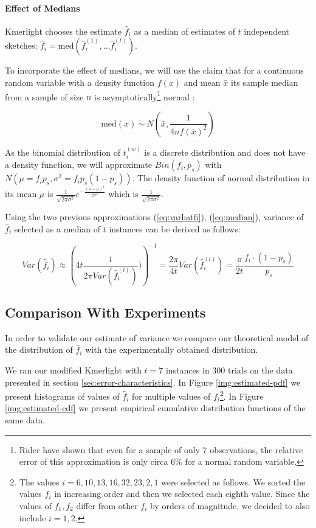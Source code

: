 \paragraph{Effect of Medians}
Kmerlight chooses the estimate $\hat f_i$ as a median of estimates of $t$ 
independent sketches: $\hat f_i = \mathrm{med}(\hat f_i^{(1)}, \dots \hat f_i^{(t)})$.

To incorporate the effect of medians, we will use the claim that for a continuous random
variable with a density function $f(x)$ and mean $\bar x$ its sample median from a sample of
size $n$ is asymptotically\footnote{Rider \cite{Rider1960} have shown that 
even for a sample of only $7$ observations, the relative error of this approximation is only
circa 6\% for a normal random variable.} normal \cite{WikiMedian}:

\begin{equation} \label{eq:median}
\mathrm{med}(x) ~\dot\sim~ N\left(\bar x, \frac{1}{4nf(\bar x)^2}\right)
\end{equation}

As the binomial distribution of $t_i^{(w)}$ is a discrete distribution and does
not have a density function, we will approximate $Bin(f_i, p_s)$ with
$N(\mu = f_i p_s, \sigma^2 = f_i p_s(1-p_s))$. The density function of normal distribution
in its mean $\mu$ is $\frac{1}{\sqrt{2\pi\sigma^2}} e^{-\frac{(\mu - \mu)^2}{2\sigma^2}}$
which is $\frac{1}{\sqrt{2\pi\sigma^2}}$.

Using the two previous approximations (\ref{eq:varhatfi}), (\ref{eq:median}), 
variance of $\hat f_i$ selected as a median of $t$ instances can be derived as follows:

\begin{equation} \label{eq:variance}
Var(\hat f_i) \approx \left( 4t\frac{1}{2\pi Var(\hat f_i^{(l)})}) \right)^{-1} =
\frac{2\pi}{4t} Var(\hat f_i^{(l)}) = \frac{\pi}{2t} \frac{f_i \cdot (1 - p_s)}{p_s}
\end{equation}


\subsection{Comparison With Experiments}
\label{sec:variance-experiments}
In order to validate our estimate of variance we compare our theoretical model of the distribution 
of $\hat f_i$ with the experimentally obtained distribution.

We ran our modified Kmerlight with $t=7$ instances in 300 trials on the data presented in 
section \ref{sec:error-characteristics}. In Figure \ref{img:estimated-pdf}
we present histograms of values of $\hat f_i$ for multiple values of $f_i$\footnote{
The values $i = 6,10,13,16,32,23,2,1$ were selected as follows. We sorted the values 
$f_i$ in increasing order and then we selected each eighth value. Since the values of
$f_1, f_2$ differ from other $f_i$ by orders of magnitude, we decided to also include $i=1,2$.}.
In Figure \ref{img:estimated-cdf} we present empirical cumulative distribution functions
of the same data. 

